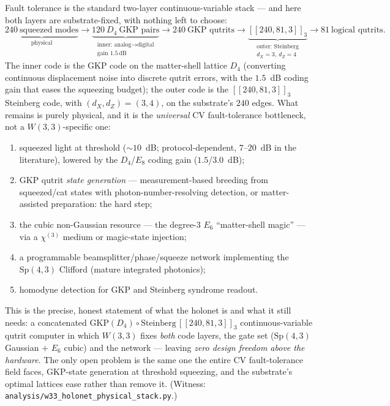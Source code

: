 \documentclass[11pt]{article}
\begin{document}
Fault tolerance is the standard two-layer continuous-variable stack --- and here
both layers are substrate-fixed, with nothing left to choose:
\[
  \underbrace{240\ \text{squeezed modes}}_{\text{physical}}
  \to \underbrace{120\ D_4\ \text{GKP pairs}}_{\substack{\text{inner: analog}\to\text{digital}\\ \text{gain }1.5\,\text{dB}}}
  \to 240\ \text{GKP qutrits}
  \to \underbrace{[[240,81,3]]_3}_{\substack{\text{outer: Steinberg}\\d_X=3,\ d_Z=4}}
  \to 81\ \text{logical qutrits}.
\]
The inner code is the GKP code on the matter-shell lattice $D_4$ (converting
continuous displacement noise into discrete qutrit errors, with the $1.5$~dB
coding gain that eases the squeezing budget); the outer code is the
$[[240,81,3]]_3$ Steinberg code, with $(d_X,d_Z)=(3,4)$, on the substrate's
$240$ edges. What remains is
purely physical, and it is the \emph{universal} CV fault-tolerance bottleneck,
not a $W(3,3)$-specific one:
\begin{enumerate}
\item squeezed light at threshold ($\sim 10$~dB; protocol-dependent, $7\text{--}20$~dB
  in the literature), lowered by the $D_4$/$E_8$ coding gain ($1.5$/$3.0$~dB);
\item GKP qutrit \emph{state generation} --- measurement-based breeding from
  squeezed/cat states with photon-number-resolving detection, or matter-assisted
  preparation: the hard step;
\item the cubic non-Gaussian resource --- the degree-$3$ $E_6$ ``matter-shell
  magic'' --- via a $\chi^{(3)}$ medium or magic-state injection;
\item a programmable beamsplitter/phase/squeeze network implementing the
  $\mathrm{Sp}(4,3)$ Clifford (mature integrated photonics);
\item homodyne detection for GKP and Steinberg syndrome readout.
\end{enumerate}
This is the precise, honest statement of what the holonet is and what it still
needs: a concatenated $\mathrm{GKP}(D_4)\circ\text{Steinberg}\,[[240,81,3]]_3$
continuous-variable qutrit computer in which $W(3,3)$ fixes \emph{both} code
layers, the gate set ($\mathrm{Sp}(4,3)$ Gaussian $+$ $E_6$ cubic) and the
network --- leaving \emph{zero design freedom above the hardware}. The only open
problem is the same one the entire CV fault-tolerance field faces, GKP-state
generation at threshold squeezing, and the substrate's optimal lattices ease
rather than remove it. (Witness:
\texttt{analysis/w33\_holonet\_physical\_stack.py}.)
\end{document}

